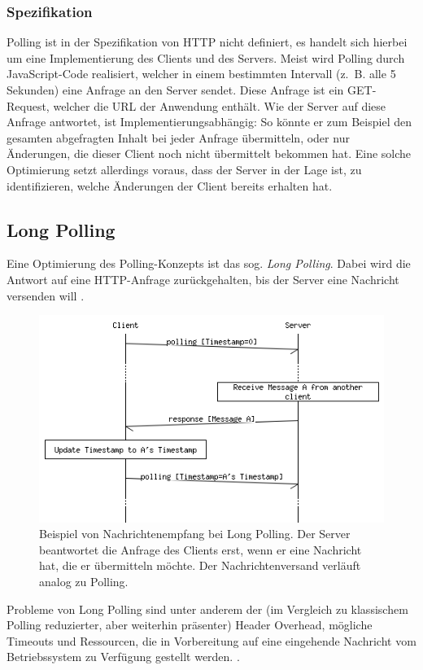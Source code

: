 \documentclass[sigplan, screen]{acmart}
\begin{document}
\subsubsection{Spezifikation}

Polling ist in der Spezifikation von HTTP nicht definiert, es handelt sich hierbei um eine Implementierung des Clients und des Servers.
Meist wird Polling durch JavaScript-Code realisiert, welcher in einem bestimmten Intervall (z. B. alle 5 Sekunden) eine Anfrage an den Server sendet.
Diese Anfrage ist ein GET-Request, welcher die URL der Anwendung enthält.
Wie der Server auf diese Anfrage antwortet, ist Implementierungsabhängig:
So könnte er zum Beispiel den gesamten abgefragten Inhalt bei jeder Anfrage übermitteln, oder nur Änderungen, die dieser Client noch nicht übermittelt bekommen hat.
Eine solche Optimierung setzt allerdings voraus, dass der Server in der Lage ist, zu identifizieren, welche Änderungen der Client bereits erhalten hat.

\subsection{Long Polling}

Eine Optimierung des Polling-Konzepts ist das sog. \emph{Long Polling}.
Dabei wird die Antwort auf eine HTTP-Anfrage zurückgehalten, bis der Server eine Nachricht versenden will \cite{noauthor_long_2021}.

\begin{figure}[H]
  \centering
  \includegraphics[width=.45\textwidth]{assets/msc/long-polling.png}
  \caption[Nachrichtenempfang bei Long Polling]{Beispiel von Nachrichtenempfang bei Long Polling.
    Der Server beantwortet die Anfrage des Clients erst, wenn er eine Nachricht hat, die er übermitteln möchte.
    Der Nachrichtenversand verläuft analog zu Polling.}
  \label{fig:long_polling}
\end{figure}

Probleme von Long Polling sind unter anderem der (im Vergleich zu klassischem Polling reduzierter, aber weiterhin präsenter)
Header Overhead, mögliche Timeouts und Ressourcen, die in Vorbereitung auf eine eingehende Nachricht vom Betriebssystem
zu Verfügung gestellt werden. \cite[Abs. 2.2]{saint-andre_known_2011}.
\end{document}
